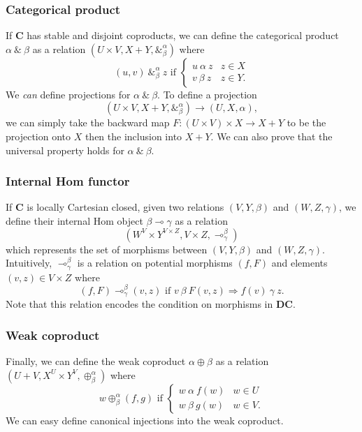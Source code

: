 \documentclass[a4paper]{article}
\newcommand{\DC}{\textbf{DC}}
\newcommand{\C}{\textbf{C}}
\begin{document}
\subsubsection{Categorical product}
If \C{} has stable and disjoint coproducts, we can define the categorical product $\alpha \ \&\ \beta$ as a relation $(U\times V, X+Y,\&^\alpha_\beta)$ where
\begin{equation*}
    (u,v)\ \&^\alpha_\beta\ z\text{ if }
    \begin{cases}
        u\ \alpha\ z & z\in X \\
        v\ \beta\ z & z\in Y.
    \end{cases}
\end{equation*}
We \emph{can} define projections for $\alpha\ \&\ \beta$. To define a projection
\begin{equation*}
    (U\times V,X+Y,\&^\alpha_\beta)\to(U,X,\alpha),
\end{equation*}
we can simply take the backward map $F:(U\times V)\times X\to X+Y$ to be the projection onto $X$ then the inclusion into $X+Y$. We can also prove that the universal property holds for $\alpha\ \&\ \beta$.

\subsubsection{Internal Hom functor}
If \C{} is locally Cartesian closed, given two relations $(V, Y,\beta)$ and $(W,Z,\gamma)$, we define their internal Hom object $\beta\multimap\gamma$ as a relation
\begin{equation*}
    (W^V\times Y^{V\times Z}, V\times Z,\multimap^\beta_\gamma)
\end{equation*} 
which represents the set of morphisms between $(V,Y,\beta)$ and $(W,Z,\gamma)$. Intuitively, $\multimap^\beta_\gamma$ is a relation on potential morphisms $(f,F)$ and elements $(v,z)\in V\times Z$ where 
\begin{equation*}
    (f,F) \multimap^\beta_\gamma (v,z)\text{ if } v\ \beta\ F(v,z)\Rightarrow f(v)\ \gamma\ z.
\end{equation*}
Note that this relation encodes the condition on morphisms in \DC{}.

\subsubsection{Weak coproduct}
Finally, we can define the weak coproduct $\alpha\oplus\beta$ as a relation $(U+V,X^U\times Y^V,\oplus^\alpha_\beta)$ where
\begin{equation*}
    w\oplus^\alpha_\beta (f,g)\text{ if }
    \begin{cases}
        w\ \alpha\ f(w) & w\in U \\
        w\ \beta\ g(w) & w\in V.
    \end{cases}
\end{equation*}
We can easy define canonical injections into the weak coproduct.
\end{document}
